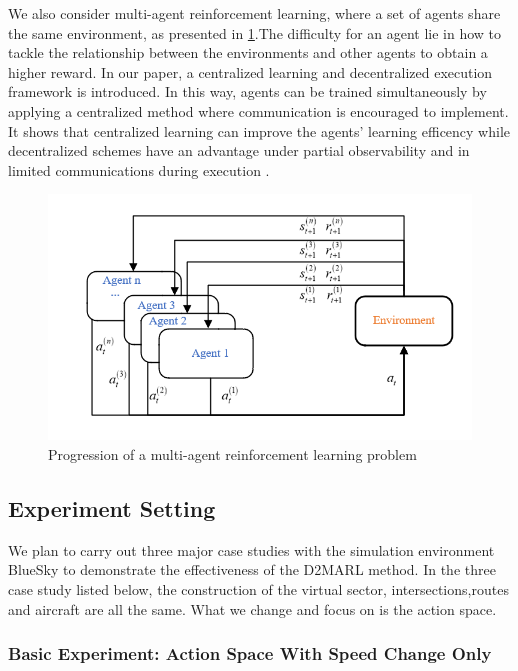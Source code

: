We also consider multi-agent reinforcement learning, where a set of agents share the same environment, as presented in \ref{fig:multi_agent}.The difficulty for an agent lie in how to tackle the relationship between the environments and other agents to obtain a higher reward. In our paper, a centralized learning and decentralized execution framework is introduced. In this way, agents can be trained simultaneously by applying a centralized method where communication is encouraged to implement. It shows that centralized learning can improve the agents' learning efficency while decentralized schemes have an advantage under partial observability and in limited communications during execution \citep{foerster2017counterfactual}.

\begin{figure}[htbp]
    \centering
    \includegraphics[scale=0.66]{images/multi_agent.png}
    \caption{Progression of a multi-agent reinforcement learning problem}
    \label{fig:multi_agent}
\end{figure}


\subsection{Experiment Setting}
\label{sec:experiment}

We plan to carry out three major case studies with the simulation environment BlueSky to demonstrate the effectiveness of the D2MARL method. In the three case study listed below, the construction of the virtual sector, intersections,routes and aircraft are all the same. What we change and focus on is the action space.

\subsubsection{Basic Experiment: Action Space With Speed Change Only}


